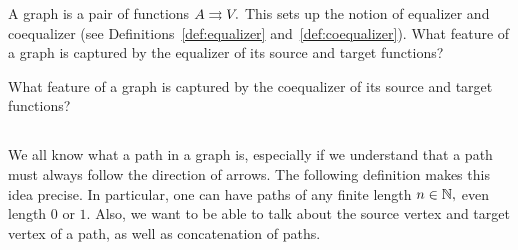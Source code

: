 \documentclass[../main/CT4S-EN-RU]{subfiles}
\begin{document}
\begin{exerciseRUS}\label{exc:lattice}
\end{exerciseRUS}

\begin{exerciseENG}\label{exc:(co)equalizer of graph}
A graph is a pair of functions $A\rightrightarrows V.$ This sets up the notion of equalizer and coequalizer (see Definitions~\ref{def:equalizer} and~\ref{def:coequalizer}). 
\sexc What feature of a graph is captured by the equalizer of its source and target functions? 
\item What feature of a graph is captured by the coequalizer of its source and target functions?
\endsexc
\end{exerciseENG}

\begin{exerciseRUS}\label{exc:(co)equalizer of graph}
\end{exerciseRUS}


\subsection{}\label{sec:paths in graph}

\begin{blockENG}
We all know what a path in a graph is, especially if we understand that a path must always follow the direction of arrows. The following definition makes this idea precise. In particular, one can have paths of any finite length $n\in{\mathbb N},$ even length $0$ or $1.$ Also, we want to be able to talk about the source vertex and target vertex of a path, as well as concatenation of paths.
\end{blockENG}
\end{document}
